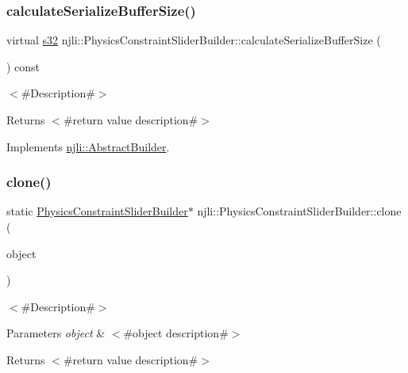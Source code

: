 \subsubsection{\texorpdfstring{calculate\+Serialize\+Buffer\+Size()}{calculateSerializeBufferSize()}}
{\footnotesize\ttfamily virtual \mbox{\hyperlink{_util_8h_aa62c75d314a0d1f37f79c4b73b2292e2}{s32}} njli\+::\+Physics\+Constraint\+Slider\+Builder\+::calculate\+Serialize\+Buffer\+Size (\begin{DoxyParamCaption}{ }\end{DoxyParamCaption}) const\hspace{0.3cm}{\ttfamily [virtual]}}

$<$\#\+Description\#$>$

\begin{DoxyReturn}{Returns}
$<$\#return value description\#$>$ 
\end{DoxyReturn}


Implements \mbox{\hyperlink{classnjli_1_1_abstract_builder_aa1d220053e182c37b31b427499c6eacf}{njli\+::\+Abstract\+Builder}}.

\mbox{\label{classnjli_1_1_physics_constraint_slider_builder_ae1deeaba866dddbb8a71ec1b28571ea4}} 
\subsubsection{\texorpdfstring{clone()}{clone()}}
{\footnotesize\ttfamily static \mbox{\hyperlink{classnjli_1_1_physics_constraint_slider_builder}{Physics\+Constraint\+Slider\+Builder}}$\ast$ njli\+::\+Physics\+Constraint\+Slider\+Builder\+::clone (\begin{DoxyParamCaption}\item[{const \mbox{\hyperlink{classnjli_1_1_physics_constraint_slider_builder}{Physics\+Constraint\+Slider\+Builder}} \&}]{object }\end{DoxyParamCaption})\hspace{0.3cm}{\ttfamily [static]}}

$<$\#\+Description\#$>$


\begin{DoxyParams}{Parameters}
{\em object} & $<$\#object description\#$>$\\
\hline
\end{DoxyParams}
\begin{DoxyReturn}{Returns}
$<$\#return value description\#$>$ 
\end{DoxyReturn}
\mbox{\label{classnjli_1_1_physics_constraint_slider_builder_ad5e304bea0271dd4a80c904a96e569cc}} 
